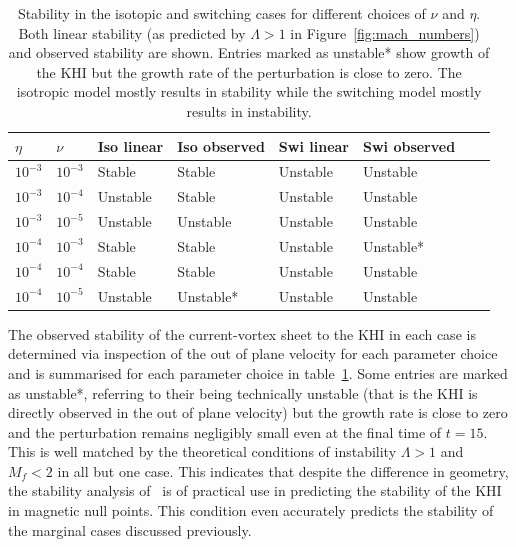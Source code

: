 \begin{table}[t]
\centering
\begin{tabular}{llllllll}
$\eta$    & $\nu$     & Iso linear & Iso observed & Swi linear & Swi observed  \\
\midrule
$10^{-3}$ & $10^{-3}$ & Stable     & Stable       & Unstable   & Unstable         & \\
$10^{-3}$ & $10^{-4}$ & Unstable   & Stable       & Unstable   & Unstable         & \\
$10^{-3}$ & $10^{-5}$ & Unstable   & Unstable     & Unstable   & Unstable         & \\
$10^{-4}$ & $10^{-3}$ & Stable     & Stable       & Unstable   & Unstable*         & \\
$10^{-4}$ & $10^{-4}$ & Stable     & Stable       & Unstable   & Unstable         & \\
$10^{-4}$ & $10^{-5}$ & Unstable   & Unstable*     & Unstable   & Unstable         &
\end{tabular}
\caption{Stability in the isotopic and switching cases for different choices of $\nu$ and $\eta$. Both linear stability (as predicted by $\Lambda > 1$ in Figure~\ref{fig:mach_numbers}) and observed stability are shown. Entries marked as unstable* show growth of the KHI but the growth rate of the perturbation is close to zero. The isotropic model mostly results in stability while the switching model mostly results in instability.}
\label{tab:stability}
\end{table}

The observed stability of the current-vortex sheet to the KHI in each case is determined via inspection of the out of plane velocity for each parameter choice and is summarised for each parameter choice in table~\ref{tab:stability}. Some entries are marked as unstable*, referring to their being technically unstable (that is the KHI is directly observed in the out of plane velocity) but the growth rate is close to zero and the perturbation remains negligibly small even at the final time of $t=15$. This is well matched by the theoretical conditions of instability $\Lambda > 1$ and $M_f < 2$ in all but one case. This indicates  that despite the difference in geometry, the stability analysis of~\cite{einaudiResistiveInstabilitiesFlowing1986} is of practical use in predicting the stability of the KHI in magnetic null points. This condition even accurately predicts the stability of the marginal cases discussed previously. 

